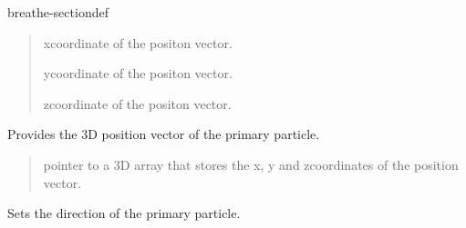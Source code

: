 \documentclass[letterpaper,10pt,english]{sphinxmanual}
\begin{document}
\begin{fulllineitems}
\begin{sphinxuseclass}{breathe-sectiondef}
\begin{fulllineitems}
\sphinxAtStartPar
\begin{quote}\begin{description}
\sphinxAtStartPar
\sphinxstylestrong{{[}in{]}} x\sphinxhyphen{}coordinate of the positon vector. 

\sphinxAtStartPar
\sphinxstylestrong{{[}in{]}} y\sphinxhyphen{}coordinate of the positon vector. 

\sphinxAtStartPar
\sphinxstylestrong{{[}in{]}} z\sphinxhyphen{}coordinate of the positon vector. 

\end{description}\end{quote}


\end{fulllineitems}


\begin{fulllineitems}
\label{\detokenize{Simulation/SimulationCodeDoc:_CPPv4NK16PrimaryGenerator11GetPositionEv}}
\pysigstartsignatures
\pysigstartmultiline
{}
\pysigstopmultiline
\pysigstopsignatures
\sphinxAtStartPar
Provides the 3D position vector of the primary particle. 

\sphinxAtStartPar
\begin{quote}\begin{description}
\sphinxAtStartPar
pointer to a 3D array that stores the x, y and z\sphinxhyphen{}coordinates of the position vector. 

\end{description}\end{quote}


\end{fulllineitems}


\begin{fulllineitems}
\label{\detokenize{Simulation/SimulationCodeDoc:_CPPv4N16PrimaryGenerator12SetDirectionEPd}}
\pysigstartsignatures
\pysigstartmultiline
{}
\pysigstopmultiline
\pysigstopsignatures
\sphinxAtStartPar
Sets the direction of the primary particle. 


\end{fulllineitems}
\end{sphinxuseclass}
\end{fulllineitems}
\end{document}
